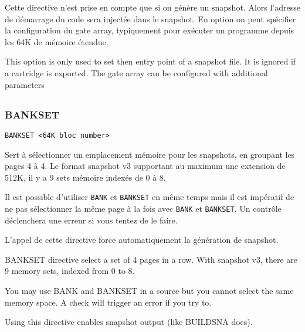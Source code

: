 \begin{xfr}
Cette directive n'est prise en compte que si on génère un snapshot. Alors l'adresse de démarrage du code sera injectée dans le snapshot. En option on peut spécifier la configuration du gate array, typiquement pour exécuter un programme depuis les 64K de mémoire étendue.
\end{xfr}

\begin{xen}
This option is only used to set then entry point of a snapshot file. It is ignored if a cartridge is exported.
The gate array can be configured with additional parameters
\end{xen}

\subsection{}

\subsubsection{BANKSET}
\begin{verbatim}
BANKSET <64K bloc number>
\end{verbatim}

\begin{xfr}
Sert à sélectionner un emplacement mémoire pour les snapshots, en groupant les pages 4 à 4. Le format snapshot v3 supportant au maximum une extension de 512K, il y a 9 sets mémoire indexés de 0 à 8.

Il est possible d'utiliser \texttt{BANK} et \texttt{BANKSET} en même temps mais il est impératif de ne pas sélectionner la même page à la fois avec \texttt{BANK} et \texttt{BANKSET}. Un contrôle déclenchera une erreur si vous tentez de le faire.

L'appel de cette directive force automatiquement la génération de snapshot.
\end{xfr}

\begin{xen}
BANKSET directive select a set of 4 pages in a row. With snapshot v3, there are 9 memory sets, indexed from 0 to 8.

You may use BANK and BANKSET in a source but you cannot select the same memory space. A check will trigger an error if you try to.

Using this directive enables snapshot output (like BUILDSNA does).
\end{xen}


